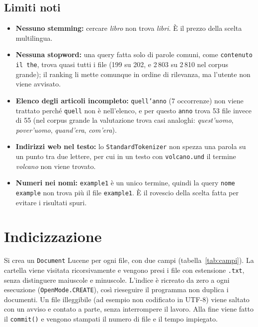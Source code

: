 \documentclass[11pt,a4paper]{article}
\newcommand{\code}[1]{\texttt{#1}}
\begin{document}
\subsection{Limiti noti}
\begin{itemize}
  \item \textbf{Nessuno stemming:} cercare \emph{libro} non trova \emph{libri}.
        È il prezzo della scelta multilingua.
  \item \textbf{Nessuna stopword:} una query fatta solo di parole comuni, come
        \code{contenuto il the}, trova quasi tutti i file (199 su 202, e 2\,803 su 2\,810 nel
        corpus grande); il ranking
        li mette comunque in ordine di rilevanza, ma l'utente non viene avvisato.
  \item \textbf{Elenco degli articoli incompleto:} \code{quell'anno} (7 occorrenze)
        non viene trattato perché \code{quell} non è nell'elenco, e per questo
        \code{anno} trova 53 file invece di 55 (nel corpus grande la valutazione trova
        casi analoghi: \emph{quest'uomo}, \emph{pover'uomo}, \emph{quand'era},
        \emph{com'era}).
  \item \textbf{Indirizzi web nel testo:} lo \code{StandardTokenizer} non spezza una
        parola su un punto tra due lettere, per cui in un testo con
        \code{volcano.und} il termine \emph{volcano} non viene trovato.
  \item \textbf{Numeri nei nomi:} \code{example1} è un unico termine, quindi la
        query \code{nome example} non trova più il file \code{example1}. È il
        rovescio della scelta fatta per evitare i risultati spuri.
\end{itemize}

\section{Indicizzazione}

Si crea un \code{Document} Lucene per ogni file, con due campi
(tabella~\ref{tab:campi}). La cartella viene visitata ricorsivamente e vengono presi
i file con estensione \code{.txt}, senza distinguere maiuscole e minuscole.
L'indice è ricreato da zero a ogni esecuzione (\code{OpenMode.CREATE}), così
rieseguire il programma non duplica i documenti. Un file illeggibile (ad esempio
non codificato in UTF-8) viene saltato con un avviso e contato a parte, senza
interrompere il lavoro. Alla fine viene fatto il \code{commit()} e vengono stampati
il numero di file e il tempo impiegato.
\end{document}
